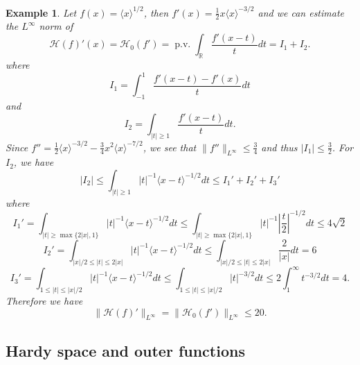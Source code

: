 \documentclass[reqno,12pt,letterpaper]{amsart}
\newtheorem{exa}[prop]{Example}
\numberwithin{equation}{section}
\numberwithin{prop}{section}
\DeclareMathOperator{\pv}{p.v.}
\begin{document}
\begin{exa}
Let $f(x)=\langle x\rangle^{1/2}$, then $f'(x)=\frac{1}{2}x\langle x\rangle^{-3/2}$ and we can estimate the $L^\infty$ norm of 
\begin{equation*}
\mathcal{H}(f)'(x)=\mathcal{H}_0(f')=\pv\int_{\mathbb{R}}\frac{f'(x-t)}{t}dt=I_1+I_2.
\end{equation*}
where
\begin{equation*}
I_1=\int_{-1}^1\frac{f'(x-t)-f'(x)}{t}dt
\end{equation*}
and 
\begin{equation*}
I_2=\int_{|t|\geq 1}\frac{f'(x-t)}{t}dt.
\end{equation*}
Since $f''=\frac{1}{2}\langle x\rangle^{-3/2}-\frac{3}{4}x^2\langle x\rangle^{-7/2}$, we see that $\|f''\|_{L^\infty}\leq \frac{3}{4}$ and thus $|I_1|\leq\frac{3}{2}$. For $I_2$, we have
\begin{equation*}
|I_2|\leq\int_{|t|\geq1}|t|^{-1}\langle x-t\rangle^{-1/2}dt\leq I_1'+I_2'+I_3'
\end{equation*}
where
\begin{equation*}
I_1'=\int_{|t|\geq\max\{2|x|,1\}}|t|^{-1}\langle x-t\rangle^{-1/2}dt\leq\int_{|t|\geq\max\{2|x|,1\}}|t|^{-1}\left|\frac{t}{2}\right|^{-1/2}dt\leq 4\sqrt{2}
\end{equation*}
\begin{equation*}
I_2'=\int_{|x|/2\leq|t|\leq2|x|}|t|^{-1}\langle x-t\rangle^{-1/2}dt
\leq\int_{|x|/2\leq|t|\leq2|x|}\frac{2}{|x|}dt=6
\end{equation*}
\begin{equation*}
I_3'=\int_{1\leq|t|\leq|x|/2}|t|^{-1}\langle x-t\rangle^{-1/2}dt
\leq\int_{1\leq|t|\leq|x|/2}|t|^{-3/2}dt\leq2\int_1^{\infty}t^{-3/2}dt
=4.
\end{equation*}
Therefore we have 
\begin{equation}
\label{e:example2}
\|\mathcal{H}(f)'\|_{L^\infty}=\|\mathcal{H}_0(f')\|_{L^\infty}\leq 20.
\end{equation}
\end{exa}

\subsection{Hardy space and outer functions}
\label{s:hardy}

\end{document}
